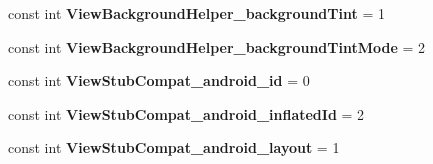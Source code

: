 \begin{DoxyCompactItemize}
\item 
\hypertarget{classClient_1_1Droid_1_1Resource_1_1Styleable_a5bfc590e08afaaef57e7f869ae615e1c}{}const int {\bfseries View\+Background\+Helper\+\_\+background\+Tint} = 1\label{classClient_1_1Droid_1_1Resource_1_1Styleable_a5bfc590e08afaaef57e7f869ae615e1c}

\item 
\hypertarget{classClient_1_1Droid_1_1Resource_1_1Styleable_a70edca6141bf73dbe9046cb6ae05a0f6}{}const int {\bfseries View\+Background\+Helper\+\_\+background\+Tint\+Mode} = 2\label{classClient_1_1Droid_1_1Resource_1_1Styleable_a70edca6141bf73dbe9046cb6ae05a0f6}

\item 
\hypertarget{classClient_1_1Droid_1_1Resource_1_1Styleable_a5594aa4c77754ecbfe0afcf8011b48d7}{}const int {\bfseries View\+Stub\+Compat\+\_\+android\+\_\+id} = 0\label{classClient_1_1Droid_1_1Resource_1_1Styleable_a5594aa4c77754ecbfe0afcf8011b48d7}

\item 
\hypertarget{classClient_1_1Droid_1_1Resource_1_1Styleable_aef02915e7e51322dcc108b2f1e8300ed}{}const int {\bfseries View\+Stub\+Compat\+\_\+android\+\_\+inflated\+Id} = 2\label{classClient_1_1Droid_1_1Resource_1_1Styleable_aef02915e7e51322dcc108b2f1e8300ed}

\item 
\hypertarget{classClient_1_1Droid_1_1Resource_1_1Styleable_a622a35aa457f896fc857ba741e835774}{}const int {\bfseries View\+Stub\+Compat\+\_\+android\+\_\+layout} = 1\label{classClient_1_1Droid_1_1Resource_1_1Styleable_a622a35aa457f896fc857ba741e835774}

\end{DoxyCompactItemize}
